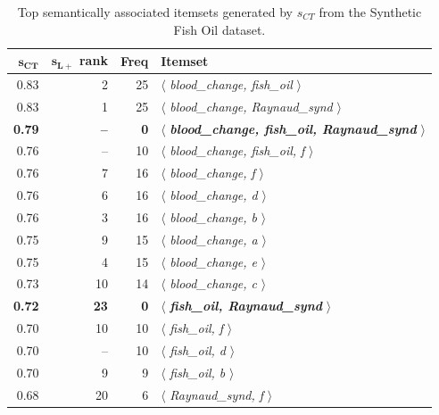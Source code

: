 \begin{table}
\begin{center}
\begin{tabular}{r |@{ } r |@{ } r | l }
  \hline
$\mathbf{s_{CT}}$  & $\mathbf{s_{L+}}$ rank    &\textbf{Freq}&   \textbf{Itemset}\\
  \hline\hline
0.83	&2&	25	&	$\langle$\emph{ blood\_change,	fish\_oil }$\rangle$\\
0.83	&1&	25	&	$\langle$\emph{ blood\_change,	Raynaud\_synd }$\rangle$\\
\textbf{0.79}	&\textbf{--}&	\textbf{0}	    &	$\langle$\emph{ \textbf{blood\_change,	fish\_oil,	Raynaud\_synd} }$\rangle$\\
0.76	&--&	10	&	$\langle$\emph{ blood\_change,	fish\_oil,	f }$\rangle$\\
0.76	&7&	16	&	$\langle$\emph{ blood\_change,	f }$\rangle$\\
0.76	&6&	16	&	$\langle$\emph{ blood\_change,	d }$\rangle$\\
0.76	&3&	16	&	$\langle$\emph{ blood\_change,	b }$\rangle$\\
0.75	&9&	15	&	$\langle$\emph{ blood\_change,	a }$\rangle$\\
0.75	&4&	15	&	$\langle$\emph{ blood\_change,	e }$\rangle$\\
0.73	&10&	14	&	$\langle$\emph{ blood\_change,	c }$\rangle$\\
\textbf{0.72}	&\textbf{23}&	\textbf{0}	    &	$\langle$\emph{ \textbf{fish\_oil,	Raynaud\_synd} }$\rangle$\\
0.70	&10&	10	&	$\langle$\emph{ fish\_oil,	f }$\rangle$\\
0.70	&--&	10	&	$\langle$\emph{ fish\_oil,	d }$\rangle$\\
0.70	&9&	9	&	$\langle$\emph{ fish\_oil,	b }$\rangle$\\
0.68	&20&	6   	&	$\langle$\emph{ Raynaud\_synd,	f }$\rangle$\\
  \hline
\end{tabular}
\end{center}
\caption[Top semantically associated itemsets on the synthetic dataset.]{\label{tbl:syn} Top semantically associated itemsets generated by $s_{CT}$ from the Synthetic Fish Oil dataset.}
\end{table}


